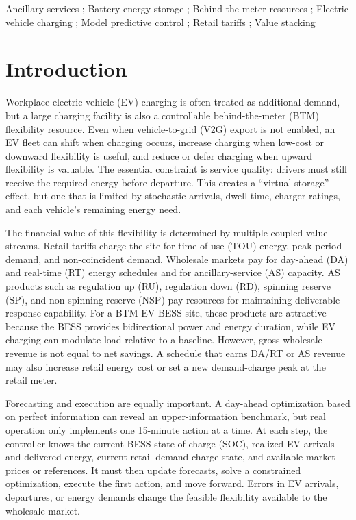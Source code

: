 \documentclass[final,5p,times]{elsarticle}
\providecommand{\sep}{; }
\begin{document}
\begin{frontmatter}
\begin{keyword}
Ancillary services \sep Battery energy storage \sep Behind-the-meter resources \sep Electric vehicle charging \sep Model predictive control \sep Retail tariffs \sep Value stacking
\end{keyword}

\end{frontmatter}

\section{Introduction}
\label{sec:introduction}

Workplace electric vehicle (EV) charging is often treated as additional demand, but a large charging facility is also a controllable behind-the-meter (BTM) flexibility resource. Even when vehicle-to-grid (V2G) export is not enabled, an EV fleet can shift when charging occurs, increase charging when low-cost or downward flexibility is useful, and reduce or defer charging when upward flexibility is valuable. The essential constraint is service quality: drivers must still receive the required energy before departure. This creates a ``virtual storage'' effect, but one that is limited by stochastic arrivals, dwell time, charger ratings, and each vehicle's remaining energy need.

The financial value of this flexibility is determined by multiple coupled value streams. Retail tariffs charge the site for time-of-use (TOU) energy, peak-period demand, and non-coincident demand. Wholesale markets pay for day-ahead (DA) and real-time (RT) energy schedules and for ancillary-service (AS) capacity. AS products such as regulation up (RU), regulation down (RD), spinning reserve (SP), and non-spinning reserve (NSP) pay resources for maintaining deliverable response capability. For a BTM EV-BESS site, these products are attractive because the BESS provides bidirectional power and energy duration, while EV charging can modulate load relative to a baseline. However, gross wholesale revenue is not equal to net savings. A schedule that earns DA/RT or AS revenue may also increase retail energy cost or set a new demand-charge peak at the retail meter.

Forecasting and execution are equally important. A day-ahead optimization based on perfect information can reveal an upper-information benchmark, but real operation only implements one 15-minute action at a time. At each step, the controller knows the current BESS state of charge (SOC), realized EV arrivals and delivered energy, current retail demand-charge state, and available market prices or references. It must then update forecasts, solve a constrained optimization, execute the first action, and move forward. Errors in EV arrivals, departures, or energy demands change the feasible flexibility available to the wholesale market.
\end{document}
